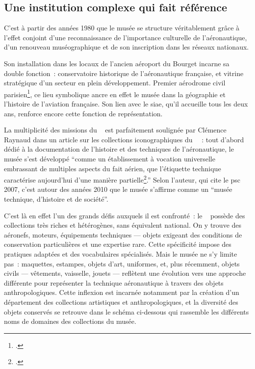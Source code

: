 \subsection{Une institution complexe qui fait référence}

C’est à partir des années 1980 que le musée se structure véritablement grâce à l’effet conjoint d’une reconnaissance de l’importance culturelle de l’aéronautique, d’un renouveau muséographique et de son inscription dans les réseaux nationaux. 

Son installation dans les locaux de l'ancien aéroport du Bourget incarne sa double fonction~: conservatoire historique de l'aéronautique française, et vitrine stratégique d'un secteur en plein développement. Premier aérodrome civil parisien\footcite{terrierAeroportParisBourget2019}, ce lieu symbolique ancre en effet le musée dans la géographie et l’histoire de l’aviation française. Son lien avec le \ac{siae}, qu’il accueille tous les deux ans, renforce encore cette fonction de représentation.

La multiplicité des missions du \mae~ est parfaitement soulignée par Clémence Raynaud dans un article sur les collections iconographiques du \mae~~: tout d'abord dédié à la documentation de l'histoire et des techniques de l'aéronautique, le musée s'est développé \enquote{comme un établissement à vocation universelle embrassant de multiples aspects du fait aérien, que l’étiquette technique caractérise aujourd’hui d’une manière partielle\footcite{raynaudMuseeTechniqueDhistoire2018}.} Selon l'auteur, qui cite le \ac{psc} 2007, c'est autour des années 2010 que le musée s'affirme comme un \enquote{musée technique, d’histoire et de société}.

C'est là en effet l'un des grands défis auxquels il est confronté~: le \mae~ possède des collections très riches et hétérogènes, sans équivalent national. On y trouve des aéronefs, moteurs, équipements techniques — objets exigeant des conditions de conservation particulières et une expertise rare. Cette spécificité impose des pratiques adaptées et des vocabulaires spécialisés. Mais le musée ne s’y limite pas~: maquettes, estampes, objets d’art, uniformes, et, plus récemment, objets civils — vêtements, vaisselle, jouets — reflètent une évolution vers une approche différente pour représenter la technique aéronautique à travers des objets anthropologiques. Cette inflexion est incarnée notamment par la création d'un département des collections artistiques et anthropologiques, et la diversité des objets conservés se retrouve dans le schéma ci-dessous qui rassemble les différents noms de domaines des collections du musée.

